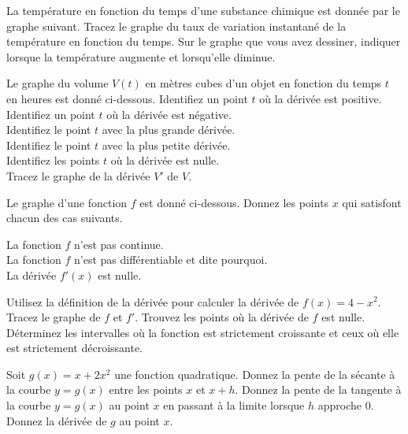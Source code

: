 \begin{question}
La température en fonction du temps d'une substance chimique est
donnée par le graphe suivant.
Tracez le graphe du taux de variation instantané de la température en
fonction du temps.  Sur le graphe que vous avez dessiner, indiquer
lorsque la température augmente et lorsqu'elle diminue.
\label{5Q13}
\end{question}

\begin{question}
Le graphe du volume $V(t)$ en mètres cubes d'un objet en fonction du
temps $t$ en heures est donné ci-dessous.
 Identifiez un point $t$ où la dérivée est positive.\\
 Identifiez un point $t$ où la dérivée est négative.\\
 Identifiez le point $t$ avec la plus grande dérivée.\\
 Identifiez le point $t$ avec la plus petite dérivée.\\
 Identifiez les points $t$ où la dérivée est nulle.\\
 Tracez le graphe de la dérivée $V'$ de $V$.
\label{5Q14}
\end{question}

\begin{question}
Le graphe d'une fonction $f$ est donné ci-dessous.
Donnez les points $x$ qui satisfont chacun des cas suivants.

 La fonction $f$ n'est pas continue.\\
 La fonction $f$ n'est pas différentiable et dite pourquoi.\\
 La dérivée $f'(x)$ est nulle.
\label{5Q15}
\end{question}

\begin{question}
Utilisez la définition de la dérivée pour calculer la dérivée de
$f(x) = 4 - x^2$.  Tracez le graphe de $f$ et $f'$.  Trouvez les
points où la dérivée de $f$ est nulle.  Déterminez les intervalles où
la fonction est strictement croissante et ceux où elle est strictement
décroissante.
\label{5Q16}
\end{question}

\begin{question}
Soit $g(x) = x+2x^2$ une fonction quadratique.  Donnez la pente
de la sécante à la courbe $y=g(x)$ entre les points $x$ et $x+h$.
Donnez la pente de la tangente à la courbe $y=g(x)$ au point $x$ en
passant à la limite lorsque $h$ approche $0$.  Donnez la dérivée de
$g$ au point $x$.
\label{5Q17}
\end{question}

